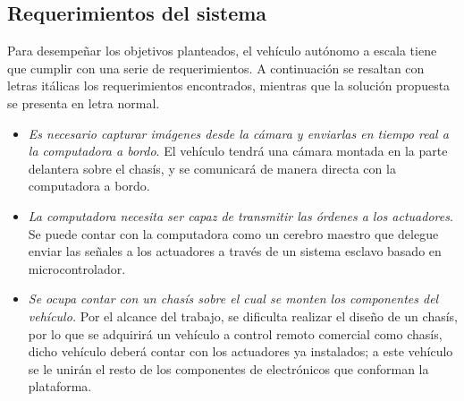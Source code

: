 \subsection{Requerimientos del sistema}
\label{ssec:req}
Para desempeñar los objetivos planteados, el vehículo autónomo a escala tiene que cumplir con una serie de requerimientos. A continuación se resaltan con letras itálicas los requerimientos encontrados, mientras que la solución propuesta se presenta en letra normal.
\begin{itemize}
	\item {\it Es necesario capturar imágenes desde la cámara y enviarlas en tiempo real a la computadora a bordo}. El vehículo tendrá una cámara montada en la parte delantera sobre el chasís, y se comunicará de manera directa con la computadora a bordo.
	\item {\it La computadora necesita ser capaz de transmitir las órdenes a los actuadores}. Se puede contar con la computadora como un cerebro maestro que delegue enviar las señales a los actuadores a través de un sistema esclavo basado en microcontrolador.
	\item {\it Se ocupa contar con un chasís sobre el cual se monten los componentes del vehículo.} Por el alcance del trabajo, se dificulta realizar el diseño de un chasís, por lo que se adquirirá un vehículo a control remoto comercial como chasís, dicho vehículo deberá contar con los actuadores ya instalados; a este vehículo se le unirán el resto de los componentes de electrónicos que conforman la plataforma.
\end{itemize}
